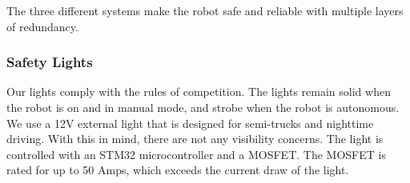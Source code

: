 The three different systems make the robot safe and reliable with multiple layers of redundancy. 


\subsubsection{Safety Lights}
Our lights comply with the rules of competition. The lights remain solid when the robot is on and in manual mode, and strobe when the robot is autonomous. We use a 12V external light that is designed for semi-trucks and nighttime driving. With this in mind, there are not any visibility concerns.  The light is controlled with an STM32 microcontroller and a MOSFET. The MOSFET is rated for up to 50 Amps, which exceeds the current draw of the light.  

